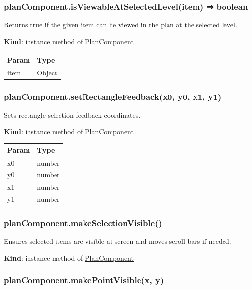 \documentclass[a4paper]{report}
\begin{document}
\hypertarget{plancomponent.isviewableatselectedlevelitem-boolean}{%
\subsubsection{planComponent.isViewableAtSelectedLevel(item) ⇒
boolean}\label{plancomponent.isviewableatselectedlevelitem-boolean}}

Returns true if the given item can be viewed in the plan at the selected
level.

\textbf{Kind}: instance method of
\protect\hyperlink{PlanComponent}{PlanComponent}

\begin{longtable}[]{@{}ll@{}}
\toprule
Param & Type\tabularnewline
\midrule
\endhead
item & Object\tabularnewline
\bottomrule
\end{longtable}

\hypertarget{plancomponent.setrectanglefeedbackx0-y0-x1-y1}{%
\subsubsection{planComponent.setRectangleFeedback(x0, y0, x1,
y1)}\label{plancomponent.setrectanglefeedbackx0-y0-x1-y1}}

Sets rectangle selection feedback coordinates.

\textbf{Kind}: instance method of
\protect\hyperlink{PlanComponent}{PlanComponent}

\begin{longtable}[]{@{}ll@{}}
\toprule
Param & Type\tabularnewline
\midrule
\endhead
x0 & number\tabularnewline
y0 & number\tabularnewline
x1 & number\tabularnewline
y1 & number\tabularnewline
\bottomrule
\end{longtable}

\hypertarget{plancomponent.makeselectionvisible}{%
\subsubsection{planComponent.makeSelectionVisible()}\label{plancomponent.makeselectionvisible}}

Ensures selected items are visible at screen and moves scroll bars if
needed.

\textbf{Kind}: instance method of
\protect\hyperlink{PlanComponent}{PlanComponent}\\

\hypertarget{plancomponent.makepointvisiblex-y}{%
\subsubsection{planComponent.makePointVisible(x,
y)}\label{plancomponent.makepointvisiblex-y}}
\end{document}
